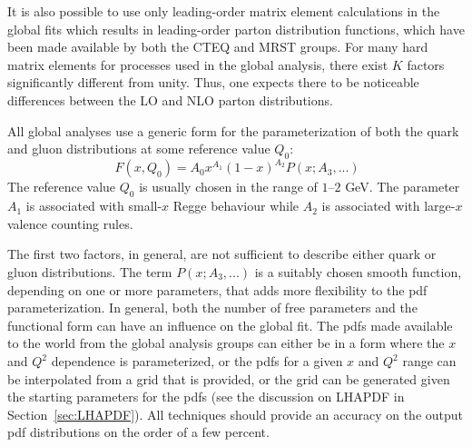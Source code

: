 \documentclass[12pt]{iopart}
\def\as{\alpha_S}
\begin{document}
It is also possible to use only leading-order matrix element calculations in the global fits which results in leading-order
parton  distribution functions, which have been made available by both the CTEQ and MRST groups. For many hard matrix elements
for processes used in the global analysis, there exist $K$ factors significantly different from unity. Thus, one expects
there to be noticeable differences between the LO and NLO parton distributions. 

All global analyses use a generic form for the parameterization of both the quark and gluon distributions at some reference value
$Q_0$:
%
\begin{equation}
\ F(x,{Q_0})={A_0}x^{A_1}(1-x)^{A_2}P(x;A_3,...) 
\end{equation}
The reference value $Q_0$ is usually chosen in the range of $1$--$2$ GeV. The parameter $A_1$ is associated with small-$x$ Regge
behaviour while $A_2$ is associated with large-$x$ valence counting rules.

The first two factors, in general, are not  sufficient to describe either quark or gluon distributions. The term
$P(x;A_3,...)$ is a suitably chosen smooth  function, depending on one or more parameters, that adds more flexibility to the
pdf parameterization. In general, both the number of free parameters and the functional form can have an influence on the
global fit. The pdfs made available to the world from the global analysis groups can either be in a form where the $x$ and
$Q^2$ dependence is parameterized, or the pdfs for a given $x$ and $Q^2$ range can be interpolated from a grid that is
provided, or the grid can be generated given the starting parameters for the pdfs (see the discussion on
LHAPDF in Section~\ref{sec:LHAPDF}). All techniques should provide an accuracy on the output pdf distributions
on the order of a few percent. 
\end{document}
